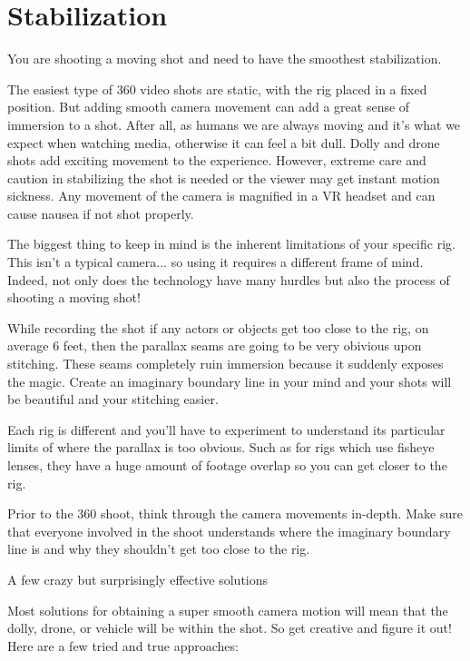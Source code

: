 \chapter{Stabilization}
\pagecolor{white}
\label{chap:24}
\begin{fullwidth}


\problem

{\large You are shooting a moving shot and need to have the smoothest stabilization. \par}

The easiest type of 360 video shots are static, with the rig placed in a fixed position. But adding smooth camera movement can add a great sense of immersion to a shot. After all, as humans we are always moving and it's what we expect when watching media, otherwise it can feel a bit dull. Dolly and drone shots add exciting movement to the experience. However, extreme care and caution in stabilizing the shot is needed or the viewer may get instant motion sickness. Any movement of the camera is magnified in a VR headset and can cause nausea if not shot properly.


\solution

The biggest thing to keep in mind is the inherent limitations of your specific rig. This isn't a typical camera... so using it requires a different frame of mind. Indeed, not only does the technology have many hurdles but also the process of shooting a moving shot!

While recording the shot if any actors or objects get too close to the rig, on average 6 feet, then the parallax seams are going to be very obivious upon stitching. These seams completely ruin immersion because it suddenly exposes the magic. Create an imaginary boundary line in your mind and your shots will be beautiful and your stitching easier.

Each rig is different and you’ll have to experiment to understand its particular limits of where the parallax is too obvious. Such as for rigs which use fisheye lenses, they have a huge amount of footage overlap so you can get closer to the rig.

Prior to the 360 shoot, think through the camera movements in-depth. Make sure that everyone involved in the shoot understands where the imaginary boundary line is and why they shouldn't get too close to the rig.

{\large A few crazy but surprisingly effective solutions \par}
Most solutions for obtaining a super smooth camera motion will mean that the dolly, drone, or vehicle will be within the shot. So get creative and figure it out! Here are a few tried and true approaches:


\end{fullwidth}
